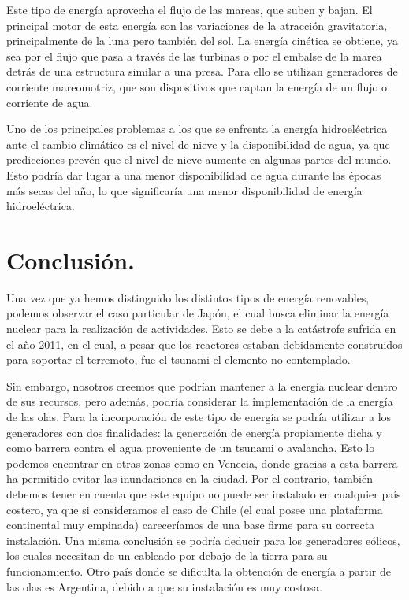 \documentclass[runningheads]{llncs}
\begin{document}
Este tipo de energía aprovecha el flujo de las mareas, que suben y bajan. El principal motor de esta energía son las variaciones de la atracción gravitatoria, principalmente de la luna pero también del sol. La energía cinética se obtiene, ya sea por el flujo que pasa a través de las turbinas o por el embalse de la marea detrás de una estructura similar a una presa. Para ello se utilizan generadores de corriente mareomotriz, que son dispositivos que captan la energía de un flujo o corriente de agua.

Uno de los principales problemas a los que se enfrenta la energía hidroeléctrica ante el cambio climático es el nivel de nieve y la disponibilidad de agua, ya que predicciones prevén que el nivel de nieve aumente en algunas partes del mundo. Esto podría dar lugar a una menor disponibilidad de agua durante las épocas más secas del año, lo que significaría una menor disponibilidad de energía hidroeléctrica.

\section{Conclusión.}
Una vez que ya hemos distinguido los distintos tipos de energía renovables, podemos observar el caso particular de Japón, el cual busca eliminar la energía nuclear para la realización de actividades. Esto se debe a la catástrofe sufrida en el año 2011, en el cual, a pesar que los reactores estaban debidamente construidos para soportar el terremoto, fue el tsunami el elemento no contemplado. 

Sin embargo, nosotros creemos que podrían mantener a la energía nuclear dentro de sus recursos, pero además, podría considerar la implementación de la energía de las olas. Para la incorporación de este tipo de energía se podría utilizar a los generadores con dos finalidades: la generación de energía propiamente dicha y como barrera contra el agua proveniente de un tsunami o avalancha. Esto lo podemos encontrar en otras zonas como en Venecia, donde gracias a esta barrera ha permitido evitar las inundaciones en la ciudad.
Por el contrario, también debemos tener en cuenta que este equipo no puede ser instalado en cualquier país costero, ya que si consideramos el caso de Chile (el cual posee una plataforma continental muy empinada) careceríamos de una base firme para su correcta instalación. Una misma conclusión se podría deducir para los generadores eólicos, los cuales necesitan de un cableado por debajo de la tierra para su funcionamiento. Otro país donde se dificulta la obtención de energía a partir de las olas es Argentina, debido a que su instalación es muy costosa.
\end{document}
